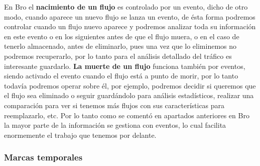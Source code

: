 En Bro el \textbf{nacimiento de un flujo} es controlado por un evento, dicho de otro 
modo, cuando aparece un nuevo flujo se lanza un evento, de ésta forma podremos 
controlar cuando un flujo nuevo aparece y podremos analizar toda su información 
en este evento o en los siguientes antes de que el flujo muera, o en el caso de 
tenerlo almacenado, antes de eliminarlo, pues una vez que lo eliminemos no 
podremos recuperarlo, por lo tanto para el análisis detallado del tráfico es 
interesante guardarlo.
\intro
\textbf{La muerte de un flujo} funciona también por eventos, siendo activado el evento cuando el 
flujo está a punto de morir, por lo tanto todavía podremos operar sobre él, 
por ejemplo, podremos decidir si queremos que el flujo sea eliminado o seguir 
guardándolo para análisis estadísticos, realizar una comparación para ver si tenemos más 
flujos con sus características para reemplazarlo, etc.
\intro
Por lo tanto como se comentó en apartados anteriores en Bro la mayor parte de 
la información se gestiona con eventos, lo cual facilita enormemente el trabajo 
que tenemos por delante.

\subsubsection{Marcas temporales}


